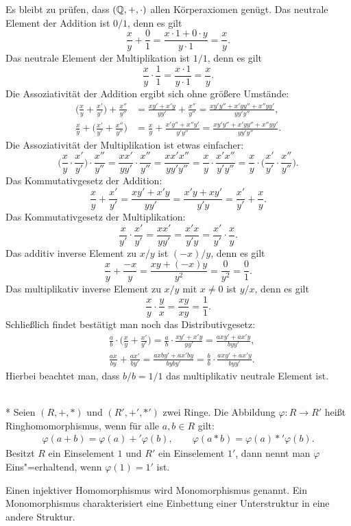 Es bleibt zu prüfen, dass $(\mathbb Q,+,\cdot)$ allen Körperaxiomen genügt.
Das neutrale Element der Addition ist $0/1$, denn es gilt
\[\frac{x}{y}+\frac{0}{1} = \frac{x\cdot 1+0\cdot y}{y\cdot 1} = \frac{x}{y}.\]
Das neutrale Element der Multiplikation ist $1/1$, denn es gilt
\[\frac{x}{y}\cdot\frac{1}{1} = \frac{x\cdot 1}{y\cdot 1} = \frac{x}{y}.\]
Die Assoziativität der Addition ergibt sich ohne größere Umstände:
\begin{align*}
\bigg(\frac{x}{y}+\frac{x'}{y'}\bigg)+\frac{x''}{y''}
&= \frac{xy'+x'y}{yy'} + \frac{x''}{y''}
= \frac{xy'y''+x'yy''+x''yy'}{yy'y''},\\
\frac{x}{y}+\bigg(\frac{x'}{y'}+\frac{x''}{y''}\bigg)
&= \frac{x}{y}+\frac{x'y''+x''y'}{y'y''}
= \frac{xy'y''+x'yy''+x''yy'}{yy'y''}.
\end{align*}
Die Assoziativität der Multiplikation ist etwas einfacher:
\[\bigg(\frac{x}{y}\cdot\frac{x'}{y'}\bigg)\cdot\frac{x''}{y''}
= \frac{xx'}{yy'}\cdot\frac{x''}{y''} = \frac{xx'x''}{yy'y''}
= \frac{x}{y}\cdot\frac{x'x''}{y'y''}
= \frac{x}{y}\cdot\bigg(\frac{x'}{y'}\cdot\frac{x''}{y''}\bigg).\]
Das Kommutativgesetz der Addition:
\[\frac{x}{y}+\frac{x'}{y'} = \frac{xy'+x'y}{yy'}
= \frac{x'y+xy'}{y'y}
= \frac{x'}{y'}+\frac{x}{y}.\]
Das Kommutativgesetz der Multiplikation:
\[\frac{x}{y'}\cdot\frac{x'}{y'}
= \frac{xx'}{yy'} = \frac{x'x}{y'y}
= \frac{x'}{y'}\cdot\frac{x}{y}.\]
Das additiv inverse Element zu $x/y$ ist $(-x)/y$, denn es gilt
\[\frac{x}{y}+\frac{-x}{y} = \frac{xy+(-x)y}{y^2}
= \frac{0}{y^2} = \frac{0}{1}.\]
Das multiplikativ inverse Element zu $x/y$ mit $x\ne 0$
ist $y/x$, denn es gilt
\[\frac{x}{y}\cdot\frac{y}{x} = \frac{xy}{xy} = \frac{1}{1}.\]
Schließlich findet bestätigt man noch das Distributivgesetz:
\begin{align*}
&\frac{a}{b}\cdot\bigg(\frac{x}{y}+\frac{x'}{y'}\bigg)
= \frac{a}{b}\cdot\frac{xy'+x'y}{yy'}
= \frac{axy'+ax'y}{byy'},\\
&\frac{ax}{by}+\frac{ax'}{by'}
= \frac{axby'+ax'by}{byby'}
= \frac{b}{b}\cdot\frac{axy'+ax'y}{byy'}.
\end{align*}
Hierbei beachtet man, dass $b/b=1/1$ das multiplikativ
neutrale Element ist.\;\qedsymbol

\begin{Definition}[Ringhomomorphismus]\mbox{}\\*
Seien $(R,+,*)$ und $(R',+',*')$ zwei Ringe. Die Abbildung
$\varphi\colon R\to R'$ heißt Ringhomomorphismus, wenn für alle
$a,b\in R$ gilt:
\begin{align*}
\varphi(a+b) = \varphi(a)+'\varphi(b),\qquad
\varphi(a*b) = \varphi(a)*'\varphi(b).
\end{align*}
Besitzt $R$ ein Einselement $1$ und $R'$ ein Einselement $1'$,
dann nennt man $\varphi$ Eins"=erhaltend, wenn $\varphi(1)=1'$ ist.
\end{Definition}
Einen injektiver Homomorphismus wird Monomorphismus genannt. Ein
Monomorphismus charakterisiert eine Einbettung einer Unterstruktur
in eine andere Struktur.

